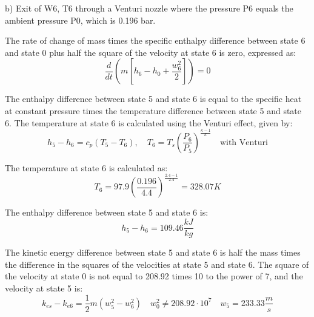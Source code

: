 b) Exit of W6, T6 through a Venturi nozzle where the pressure P6 equals the ambient pressure P0, which is 0.196 bar.

The rate of change of mass times the specific enthalpy difference between state 6 and state 0 plus half the square of the velocity at state 6 is zero, expressed as:
\[
\frac{d}{dt} \left( m \left[ h_6 - h_0 + \frac{w_6^2}{2} \right] \right) = 0
\]

The enthalpy difference between state 5 and state 6 is equal to the specific heat at constant pressure times the temperature difference between state 5 and state 6. The temperature at state 6 is calculated using the Venturi effect, given by:
\[
h_5 - h_6 = c_p (T_5 - T_6), \quad T_6 = T_s \left( \frac{P_6}{P_5} \right)^{\frac{\kappa - 1}{\kappa}} \quad \text{with Venturi}
\]

The temperature at state 6 is calculated as:
\[
T_6 = 97.9 \left( \frac{0.196}{4.4} \right)^{\frac{2.4 - 1}{2.4}} = 328.07 K
\]

The enthalpy difference between state 5 and state 6 is:
\[
h_5 - h_6 = 109.46 \frac{kJ}{kg}
\]

The kinetic energy difference between state 5 and state 6 is half the mass times the difference in the squares of the velocities at state 5 and state 6. The square of the velocity at state 0 is not equal to 208.92 times 10 to the power of 7, and the velocity at state 5 is:
\[
k_{es} - k_{e6} = \frac{1}{2} m \left( w_5^2 - w_6^2 \right) \quad w_0^2 \neq 208.92 \cdot 10^7 \quad w_5 = 233.33 \frac{m}{s}
\]